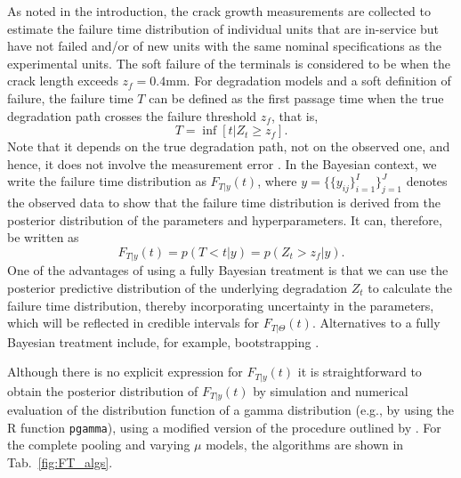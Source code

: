 As noted in the introduction, the crack growth measurements are collected to estimate the failure time distribution of individual units that are in-service but have not failed and/or of new units with the same nominal specifications as the experimental units. The soft failure of the terminals is considered to be when the crack length exceeds $z_f = 0.4$mm. For degradation models and a soft definition of failure, the failure time $T$ can be defined as the first passage time when the true degradation path crosses the failure threshold $z_f$\citep{balakrishnan_2017}, that is,
$$
T = \inf\left[ t|Z_t \geq z_f \right].
$$
Note that it depends on the true degradation path, not on the observed one, and hence, it does not involve the measurement error \citep{hamada_2008}. In the Bayesian context, we write the failure time distribution as $F_{T|y}(t)$, where $y = \{\{y_{ij}\}^I_{i = 1}\}^J_{j = 1}$ denotes the observed data to show that the failure time distribution is derived from the posterior distribution of the parameters and hyperparameters. It can, therefore, be written as
$$
F_{T|y}(t) = p(T < t | y) = p(Z_t > z_f | y).
$$
One of the advantages of using a fully Bayesian treatment is that we can use the posterior predictive distribution of the underlying degradation $Z_t$ to calculate the failure time distribution, thereby incorporating uncertainty in the parameters, which will be reflected in credible intervals for $F_{T|\Theta}(t)$. Alternatives to a fully Bayesian treatment include, for example, bootstrapping \citep{peng_2018}.

Although there is no explicit expression for $F_{T|y}(t)$ it is straightforward to obtain the posterior distribution of $F_{T|y}(t)$ by simulation and numerical evaluation of the distribution function of a gamma distribution (e.g., by using the R function \texttt{pgamma}), using a modified version of the procedure outlined by \citet[Sec.~8.2.1]{hamada_2008}. For the complete pooling and varying $\mu$ models, the algorithms are shown in Tab.~\ref{fig:FT_algs}.

